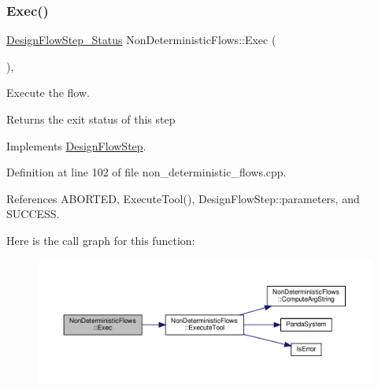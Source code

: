 \subsubsection{\texorpdfstring{Exec()}{Exec()}}
{\footnotesize\ttfamily \hyperlink{design__flow__step_8hpp_afb1f0d73069c26076b8d31dbc8ebecdf}{Design\+Flow\+Step\+\_\+\+Status} Non\+Deterministic\+Flows\+::\+Exec (\begin{DoxyParamCaption}{ }\end{DoxyParamCaption})\hspace{0.3cm}{\ttfamily [override]}, {\ttfamily [virtual]}}



Execute the flow. 

\begin{DoxyReturn}{Returns}
the exit status of this step 
\end{DoxyReturn}


Implements \hyperlink{classDesignFlowStep_a77d7e38493016766098711ea24f60b89}{Design\+Flow\+Step}.



Definition at line 102 of file non\+\_\+deterministic\+\_\+flows.\+cpp.



References A\+B\+O\+R\+T\+ED, Execute\+Tool(), Design\+Flow\+Step\+::parameters, and S\+U\+C\+C\+E\+SS.

Here is the call graph for this function\+:
\nopagebreak
\begin{figure}[H]
\begin{center}
\leavevmode
\includegraphics[width=350pt]{dd/d17/classNonDeterministicFlows_af018a9ea67d29631e1bb8eb489ac5154_cgraph}
\end{center}
\end{figure}
\mbox{\label{classNonDeterministicFlows_a80510e30acc813ada57a66815e01202c}} 
